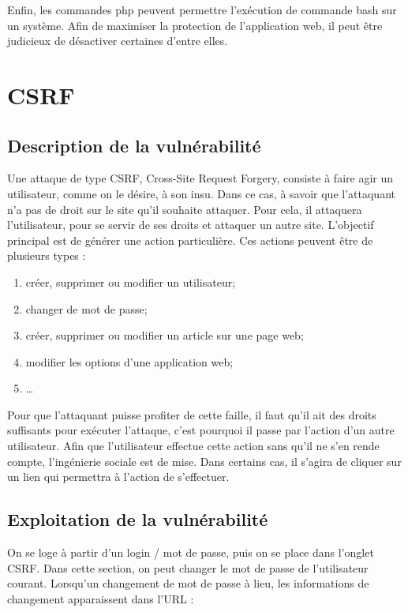 Enfin, les commandes php peuvent permettre l'exécution de commande bash sur un système. Afin de maximiser la protection de l'application web, il peut être judicieux de désactiver certaines d'entre elles.

\clearpage

\newpage

\section{CSRF}

\subsection{Description de la vulnérabilité}

Une attaque de type CSRF, Cross-Site Request Forgery, consiste à faire agir un utilisateur, comme on le désire, à son insu. Dans ce cas, à savoir que l'attaquant n'a pas de droit sur le site qu'il souhaite attaquer. Pour cela, il attaquera l'utilisateur, pour se servir de ses droits et attaquer un autre site. L'objectif principal est de générer une action particulière. Ces actions peuvent être de plusieurs types :

\begin{enumerate}
\item créer, supprimer ou modifier un utilisateur;
\item changer de mot de passe;
\item créer, supprimer ou modifier un article sur une page web;
\item modifier les options d'une application web;
\item …
\end{enumerate}

Pour que l'attaquant puisse profiter de cette faille, il faut qu'il ait des droits suffisants pour exécuter l'attaque, c'est pourquoi il passe par l'action d'un autre utilisateur. Afin que l'utilisateur effectue cette action sans qu'il ne s'en rende compte, l'ingénierie sociale est de mise. Dans certains cas, il s'agira de cliquer sur un lien qui permettra à l'action de s'effectuer.

\subsection{Exploitation de la vulnérabilité}

On se loge à partir d'un login / mot de passe, puis on se place dans l'onglet CSRF. Dans cette section, on peut changer le mot de passe de l'utilisateur courant. Lorsqu'un changement de mot de passe à lieu, les informations de changement apparaissent dans l'URL : 

